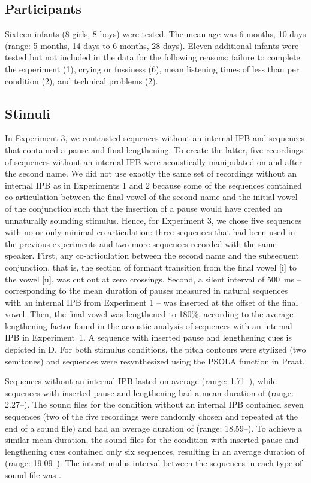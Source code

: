\documentclass[output=paper]{langscibook}
\begin{document}
\subsection{Participants}
Sixteen infants (8 girls, 8 boys) were tested. The mean age was 6 months, 10 days (range: 5 months, 14 days to 6 months, 28 days). Eleven additional infants were tested but not included in the data for the following reasons: failure to complete the experiment (1), crying or fussiness (6), mean listening times of less than  per condition (2), and technical problems (2).

\subsection{Stimuli}\largerpage
In Experiment 3, we contrasted sequences without an internal IPB and sequences that contained a pause and final lengthening. To create the latter, five recordings of sequences without an internal IPB were acoustically manipulated on and after the second name. We did not use exactly the same set of recordings without an internal IPB as in Experiments 1 and 2 because some of the sequences contained co-articulation between the final vowel of the second name and the initial vowel of the conjunction such that the insertion of a pause would have created an unnaturally sounding stimulus. Hence, for Experiment 3, we chose five sequences with no or only minimal co-articulation: three sequences that had been used in the previous experiments and two more sequences recorded with the same speaker. First, any co-articulation between the second name and the subsequent conjunction, that is, the section of formant transition from the final vowel [i] to the vowel [u], was cut out at zero crossings. Second, a silent interval of \qty{500}{\ms} -- corresponding to the mean duration of pauses measured in natural sequences with an internal IPB from Experiment 1 -- was inserted at the offset of the final vowel. Then, the final vowel was lengthened to 180\%, according to the average lengthening factor found in the acoustic analysis of sequences with an internal IPB in Experiment~1. A sequence with inserted pause and lengthening cues is depicted in D. For both stimulus conditions, the pitch contours were stylized (two semitones) and sequences were resynthesized using the PSOLA function in Praat.

Sequences without an internal IPB lasted on average  (range: 1.71–), while sequences with inserted pause and lengthening had a mean duration of  (range: 2.27–). The sound files for the condition without an internal IPB contained seven sequences (two of the five recordings were randomly chosen and repeated at the end of a sound file) and had an average duration of  (range: 18.59–). To achieve a similar mean duration, the sound files for the condition with inserted pause and lengthening cues contained only six sequences, resulting in an average duration of  (range: 19.09–). The interstimulus interval between the sequences in each type of sound file was .
\end{document}
